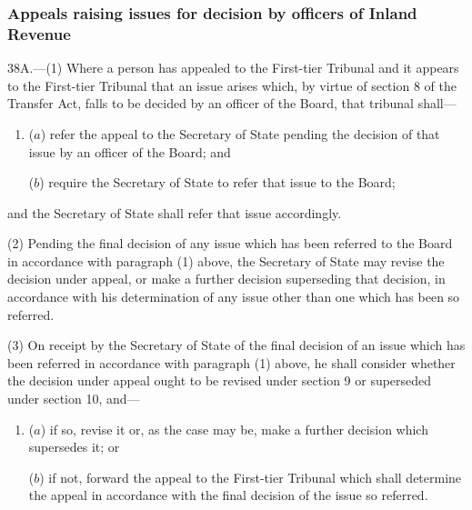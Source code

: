 \documentclass[12pt,a4paper]{article}
\begin{document}
\subsubsection[38A. Appeals raising issues for decision by officers of Inland Revenue]{Appeals raising issues for decision by officers of Inland Revenue}

38A.---(1)  Where
a person has appealed to 
the First-tier Tribunal and it appears to the First-tier Tribunal  %
that an issue arises which, by virtue of section 8 of the Transfer Act, falls to be decided by an officer of the Board, that tribunal 
shall—
\begin{enumerate}\item[]
($a$) refer the appeal to the Secretary of State pending the decision of that issue by an officer of the Board; and

($b$) require the Secretary of State to refer that issue to the Board;
\end{enumerate}
and the Secretary of State shall refer that issue accordingly.

(2) Pending the final decision of any issue which has been referred to the Board in accordance with paragraph (1) above, the Secretary of State may revise the decision under appeal, or make a further decision superseding that decision, in accordance with his determination of any issue other than one which has been so referred.

(3) On receipt by the Secretary of State of the final decision of an issue which has been referred in accordance with paragraph (1) above, he shall consider whether the decision under appeal ought to be revised under section 9 or superseded under section 10, and—
\begin{enumerate}\item[]
($a$) if so, revise it or, as the case may be, make a further decision which supersedes it; or

($b$) if not, forward the appeal to the 
First-tier Tribunal  %
which shall determine the appeal in accordance with the final decision of the issue so referred.
\end{enumerate}
\end{document}
